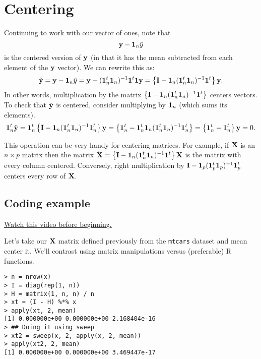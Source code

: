 \section{Centering}

Continuing to work with our vector of ones, note that 
$$
\mathbf{y} -  \mathbf{1}_n \bar y
$$
is the centered version of $\mathbf{y}$ (in that it has the mean subtracted from each element of the $\mathbf{y}$ vector).
We can rewrite this as:
$$
\tilde {\mathbf{y}} = \mathbf{y} -  \mathbf{1}_n \bar y= \mathbf{y} - (\mathbf{1}_n^t \mathbf{1}_n)^{-1} \mathbf{1}^t \mathbf{1} \mathbf{y}
= \left\{ \mathbf{I} - \mathbf{1}_n (\mathbf{1}_n^t \mathbf{1}_n)^{-1} \mathbf{1}^t \right\} \mathbf{y}.
$$
In other words, multiplication by the matrix $ \left\{ \mathbf{I} - \mathbf{1}_n (\mathbf{1}_n^t \mathbf{1}_n)^{-1} \mathbf{1}^t \right\}$
centers vectors. To check that $\tilde {\mathbf{y}}$ is centered, consider multiplying by $\mathbf{1}_n$ (which sums its elements). 
$$
\mathbf{1}_n^t \tilde {\mathbf{y}} = \mathbf{1}_n^t \left\{ \mathbf{I} - \mathbf{1}_n (\mathbf{1}_n^t \mathbf{1}_n)^{-1} \mathbf{1}_n^t \right\} \mathbf{y}
= \left\{ \mathbf{1}_n^t - \mathbf{1}_n^t \mathbf{1}_n (\mathbf{1}_n^t \mathbf{1}_n)^{-1} \mathbf{1}_n^t \right\} =
\left\{ \mathbf{1}_n^t - \mathbf{1}_n^t \right\}\mathbf{y} = 0.
$$

This operation can be very handy for centering matrices. For example, if $\mathbf{X}$ is an $n\times p$
matrix then the matrix $\tilde {\mathbf{X}}  = \left\{ \mathbf{I} - \mathbf{1}_n (\mathbf{1}_n^t \mathbf{1}_n)^{-1} \mathbf{1}^t \right\} \mathbf{X}$
is the matrix with every column centered. Conversely, right multiplication
by  $ \mathbf{I} - \mathbf{1}_p (\mathbf{1}_p^t \mathbf{1}_p)^{-1} \mathbf{1}_p^t$ centers every row
of $\mathbf{X}$.



\subsection{Coding example}

\href{https://www.youtube.com/watch?v=sixe0fUr5cg&list=PLpl-gQkQivXhdgUCdaUQcdb31CRe8Mm2y&index=4}{Watch this video before beginning.}

Let's take our $\mathbf{X}$ matrix defined previously from the \texttt{mtcars} dataset and
mean center it. We'll contrast using matrix manipulations versus (preferable)
R functions. 

\begin{verbatim}
> n = nrow(x)
> I = diag(rep(1, n))
> H = matrix(1, n, n) / n
> xt = (I - H) %*% x 
> apply(xt, 2, mean)
[1] 0.000000e+00 0.000000e+00 2.168404e-16
> ## Doing it using sweep
> xt2 = sweep(x, 2, apply(x, 2, mean))
> apply(xt2, 2, mean)
[1] 0.000000e+00 0.000000e+00 3.469447e-17
\end{verbatim}


